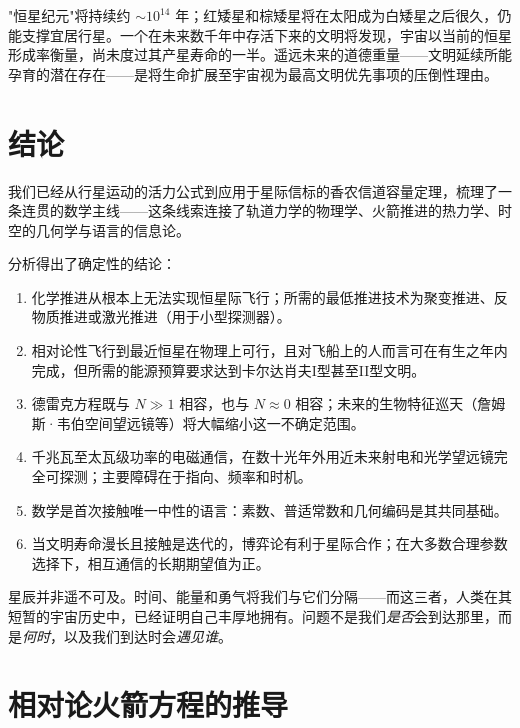 \documentclass[12pt,a4paper]{article}
\begin{document}
"恒星纪元"将持续约 $\sim 10^{14}$ 年；红矮星和棕矮星将在太阳成为白矮星之后很久，仍能支撑宜居行星。一个在未来数千年中存活下来的文明将发现，宇宙以当前的恒星形成率衡量，尚未度过其产星寿命的一半。遥远未来的道德重量——文明延续所能孕育的潜在存在——是将生命扩展至宇宙视为最高文明优先事项的压倒性理由。

\section{结论}

我们已经从行星运动的活力公式到应用于星际信标的香农信道容量定理，梳理了一条连贯的数学主线——这条线索连接了轨道力学的物理学、火箭推进的热力学、时空的几何学与语言的信息论。

分析得出了确定性的结论：

\begin{enumerate}[noitemsep]
  \item 化学推进从根本上无法实现恒星际飞行；所需的最低推进技术为聚变推进、反物质推进或激光推进（用于小型探测器）。
  \item 相对论性飞行到最近恒星在物理上可行，且对飞船上的人而言可在有生之年内完成，但所需的能源预算要求达到卡尔达肖夫I型甚至II型文明。
  \item 德雷克方程既与 $N \gg 1$ 相容，也与 $N \approx 0$ 相容；未来的生物特征巡天（詹姆斯·韦伯空间望远镜等）将大幅缩小这一不确定范围。
  \item 千兆瓦至太瓦级功率的电磁通信，在数十光年外用近未来射电和光学望远镜完全可探测；主要障碍在于指向、频率和时机。
  \item 数学是首次接触唯一中性的语言：素数、普适常数和几何编码是其共同基础。
  \item 当文明寿命漫长且接触是迭代的，博弈论有利于星际合作；在大多数合理参数选择下，相互通信的长期期望值为正。
\end{enumerate}

星辰并非遥不可及。时间、能量和勇气将我们与它们分隔——而这三者，人类在其短暂的宇宙历史中，已经证明自己丰厚地拥有。问题不是我们\textit{是否}会到达那里，而是\textit{何时}，以及我们到达时会\textit{遇见谁}。

\appendix

\section{相对论火箭方程的推导}
\end{document}
